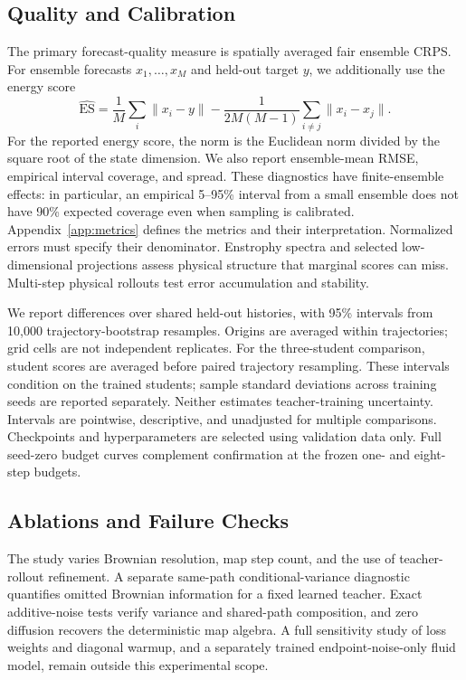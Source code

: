 \subsection{Quality and Calibration}
The primary forecast-quality measure is spatially averaged fair ensemble CRPS. For ensemble forecasts $x_1,\ldots,x_M$ and held-out target $y$, we additionally use the energy score
\begin{equation}
 \widehat{\mathrm{ES}}=
 \frac1M\sum_i\|x_i-y\|
 -\frac{1}{2M(M-1)}\sum_{i\ne j}\|x_i-x_j\|.
\end{equation}
For the reported energy score, the norm is the Euclidean norm divided by the square root of the state dimension. We also report ensemble-mean RMSE, empirical interval coverage, and spread. These diagnostics have finite-ensemble effects: in particular, an empirical 5--95\% interval from a small ensemble does not have 90\% expected coverage even when sampling is calibrated. Appendix~\ref{app:metrics} defines the metrics and their interpretation. Normalized errors must specify their denominator. Enstrophy spectra and selected low-dimensional projections assess physical structure that marginal scores can miss. Multi-step physical rollouts test error accumulation and stability.

We report differences over shared held-out histories, with 95\% intervals from 10,000 trajectory-bootstrap resamples. Origins are averaged within trajectories; grid cells are not independent replicates. For the three-student comparison, student scores are averaged before paired trajectory resampling. These intervals condition on the trained students; sample standard deviations across training seeds are reported separately. Neither estimates teacher-training uncertainty. Intervals are pointwise, descriptive, and unadjusted for multiple comparisons. Checkpoints and hyperparameters are selected using validation data only. Full seed-zero budget curves complement confirmation at the frozen one- and eight-step budgets.

\subsection{Ablations and Failure Checks}
The study varies Brownian resolution, map step count, and the use of teacher-rollout refinement. A separate same-path conditional-variance diagnostic quantifies omitted Brownian information for a fixed learned teacher. Exact additive-noise tests verify variance and shared-path composition, and zero diffusion recovers the deterministic map algebra. A full sensitivity study of loss weights and diagonal warmup, and a separately trained endpoint-noise-only fluid model, remain outside this experimental scope.



